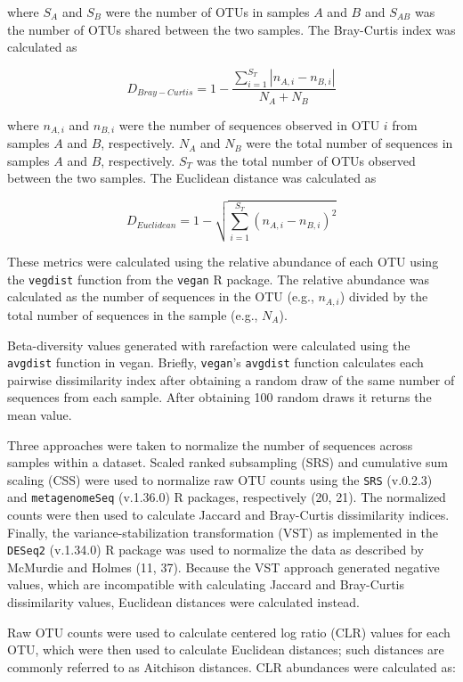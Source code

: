 \documentclass[
]{article}
\begin{document}
where \(S_A\) and \(S_B\) were the number of OTUs in samples \(A\) and
\(B\) and \(S_{AB}\) was the number of OTUs shared between the two
samples. The Bray-Curtis index was calculated as

\[D_{Bray-Curtis}=1-\frac{\sum_{i=1}^{S_T} \left| n_{A,i} - n_{B,i}\right| }{ N_A + N_B}\]

where \(n_{A,i}\) and \(n_{B,i}\) were the number of sequences observed
in OTU \(i\) from samples \(A\) and \(B\), respectively. \(N_A\) and
\(N_B\) were the total number of sequences in samples \(A\) and \(B\),
respectively. \(S_T\) was the total number of OTUs observed between the
two samples. The Euclidean distance was calculated as

\[D_{Euclidean}=1-\sqrt{\sum_{i=1}^{S_T}\left(n_{A,i} - n_{B,i}\right)^2}\]

These metrics were calculated using the relative abundance of each OTU
using the \texttt{vegdist} function from the \texttt{vegan} R package.
The relative abundance was calculated as the number of sequences in the
OTU (e.g., \(n_{A,i}\)) divided by the total number of sequences in the
sample (e.g., \(N_A\)).

Beta-diversity values generated with rarefaction were calculated using
the \texttt{avgdist} function in vegan. Briefly, \texttt{vegan}'s
\texttt{avgdist} function calculates each pairwise dissimilarity index
after obtaining a random draw of the same number of sequences from each
sample. After obtaining 100 random draws it returns the mean value.

Three approaches were taken to normalize the number of sequences across
samples within a dataset. Scaled ranked subsampling (SRS) and cumulative
sum scaling (CSS) were used to normalize raw OTU counts using the
\texttt{SRS} (v.0.2.3) and \texttt{metagenomeSeq} (v.1.36.0) R packages,
respectively (20, 21). The normalized counts were then used to calculate
Jaccard and Bray-Curtis dissimilarity indices. Finally, the
variance-stabilization transformation (VST) as implemented in the
\texttt{DESeq2} (v.1.34.0) R package was used to normalize the data as
described by McMurdie and Holmes (11, 37). Because the VST approach
generated negative values, which are incompatible with calculating
Jaccard and Bray-Curtis dissimilarity values, Euclidean distances were
calculated instead.

Raw OTU counts were used to calculate centered log ratio (CLR) values
for each OTU, which were then used to calculate Euclidean distances;
such distances are commonly referred to as Aitchison distances. CLR
abundances were calculated as:
\end{document}
